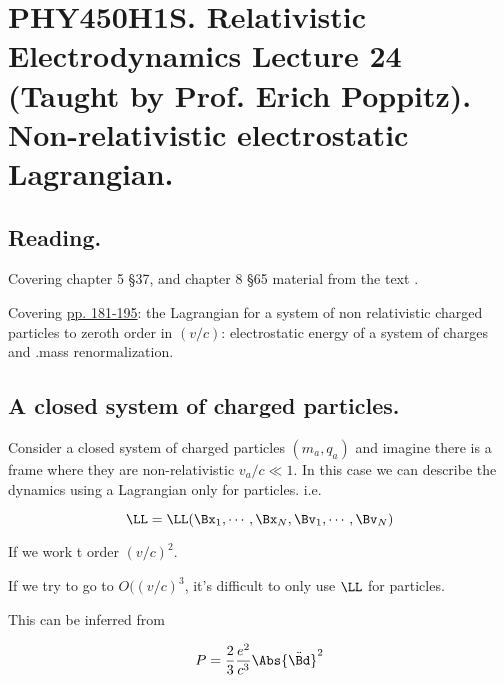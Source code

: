
%
\usepackage{cancel}

\chapter{PHY450H1S.  Relativistic Electrodynamics Lecture 24 (Taught by Prof. Erich Poppitz).  Non-relativistic electrostatic Lagrangian.}
\label{chap:relativisticElectrodynamicsL24}
{}
\date{Mar 30, 2011}

\beginArtNoToc

\section{Reading.}

Covering chapter 5 \S 37, and chapter 8 \S 65 material from the text \cite{landau1980classical}.

Covering \href{http://www.physics.utoronto.ca/~poppitz/epoppitz/PHY450_files/RelEMpp181-195.pdf}{pp. 181-195}: the Lagrangian for a system of non relativistic charged particles to zeroth order in $(v/c)$: electrostatic energy of a system of charges and .mass renormalization.

\section{A closed system of charged particles.}

Consider a closed system of charged particles $(m_a, q_a)$ and imagine there is a frame where they are non-relativistic $v_a/c \ll 1$.  In this case we can describe the dynamics using a Lagrangian only for particles.  i.e.

\begin{equation}\label{eqn:relativisticElectrodynamicsL24:50}
\LL = \LL( \Bx_1, \cdots, \Bx_N, \Bv_1, \cdots, \Bv_N)
\end{equation}

If we work t order $(v/c)^2$.

If we try to go to $O((v/c)^3$, it's difficult to only use $\LL$ for particles.

This can be inferred from 

\begin{equation}\label{eqn:relativisticElectrodynamicsL24:70}
P = \frac{2}{3} \frac{e^2}{c^3} \Abs{\ddot{\Bd}}^2
\end{equation}

